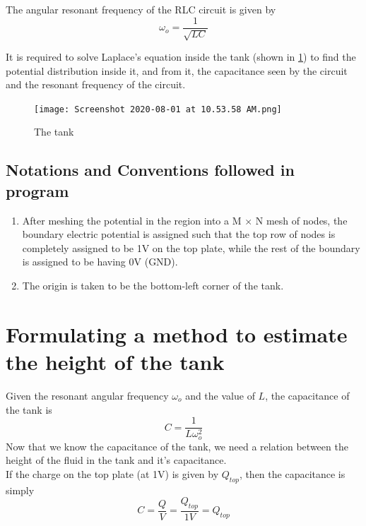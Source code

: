 \documentclass[11pt, a4paper, twoside]{report}
\begin{document}
        The angular resonant frequency of the RLC circuit is given by
            \begin{equation}
                \omega_o = \frac{1}{\sqrt{LC}}
                \label{Eq5}
            \end{equation}

        It is required to solve Laplace's equation inside the tank (shown in \ref{fig:tank}) to find the potential distribution inside it, and from it, the capacitance seen by the circuit and the resonant frequency of the circuit.

        \begin{figure}[H]
            \centering
            \texttt{[image: Screenshot 2020-08-01 at 10.53.58 AM.png]}
            \caption{The tank}
            \label{fig:tank}
        \end{figure}

        \subsection{Notations and Conventions followed in program}
        \begin{enumerate}
            \item After meshing the potential in the region into a M × N mesh of nodes, the boundary electric potential is assigned such that the top row of nodes is completely assigned to be 1V on the top plate, while the rest of the boundary is assigned to be having 0V (GND).
            \item The origin is taken to be the bottom-left corner of the tank.
        \end{enumerate}
    \section{Formulating a method to estimate the height of the tank}
        Given the resonant angular frequency $\omega_o$ and the value of $L$, the capacitance of the tank is
            \begin{equation}
                C = \frac{1}{L\omega_o^2}
            \end{equation}
        Now that we know the capacitance of the tank, we need a relation between the height of the fluid in the tank and it's capacitance.\\

        If the charge on the top plate (at 1V) is given by $Q_{top}$, then the capacitance is simply
            \begin{equation}
                C = \frac{Q}{V} = \frac{Q_{top}}{1V} = Q_{top}
                \label{Eq7}
            \end{equation}
\end{document}
